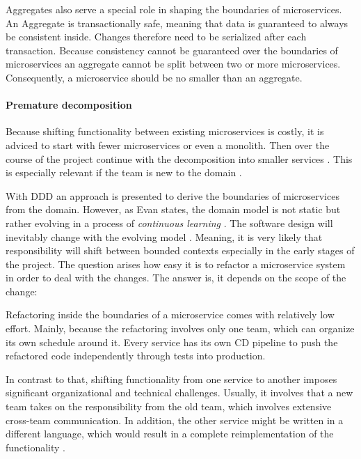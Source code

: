 Aggregates also serve a special role in shaping the boundaries of microservices.
An Aggregate is transactionally safe, meaning that data is guaranteed to always be consistent inside.
Changes therefore need to be serialized after each transaction.
Because consistency cannot be guaranteed over the boundaries of microservices an aggregate cannot be split between two or more microservices.
Consequently, a microservice should be no smaller than an aggregate.
\citep[p. 46]{Wolff2016}

\paragraph{Premature decomposition}
Because shifting functionality between existing microservices is costly, it is adviced to start with fewer microservices or even a monolith. Then over the course of the project continue with the decomposition into smaller services \citep[p. 34]{Newman2015} \cite[p. 121ff.]{Wolff2016}. 
This is especially relevant if the team is new to the domain \citep[p. 34]{Newman2015}.

With \ac{DDD} an approach is presented to derive the boundaries of microservices from the domain.
However, as Evan states, the domain model is not static but rather evolving in a process of \textit{continuous learning} \citep[p. 15]{Evans2004}.
The software design will inevitably change with the evolving model \citep[p. 3]{Evans2004}.
Meaning, it is very likely that responsibility will shift between bounded contexts especially in the early stages of the project.
The question arises how easy it is to refactor a microservice system in order to deal with the changes.
The answer is, it depends on the scope of the change:

Refactoring inside the boundaries of a microservice comes with relatively low effort.
Mainly, because the refactoring involves only one team, which can organize its own schedule around it.
Every service has its own \ac{CD} pipeline to push the refactored code independently through tests into production.
\cite[p. 33]{Wolff2016}

In contrast to that, shifting functionality from one service to another imposes significant organizational and technical challenges. 
Usually, it involves that a new team takes on the responsibility from the old team, which involves extensive cross-team communication.
In addition, the other service might be written in a different language, which would result in a complete reimplementation of the functionality
\cite[p. 33]{Wolff2016}.


